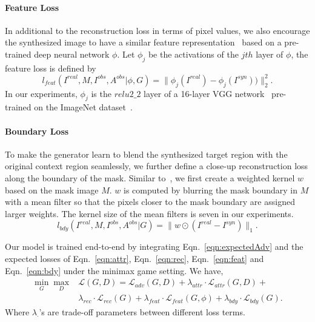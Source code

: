\documentclass[acmtog,timestamp]{acmart}
\begin{document}
\paragraph{Feature Loss}
In additional to the reconstruction loss in terms of pixel values, we also encourage the synthesized image to have a similar feature representation~\cite{johnson2016perceptual} based on a pre-trained deep neural network $\phi$. Let $\phi_{j}$ be the activations of the $jth$ layer of $\phi$, the feature loss is defined by
\begin{equation}
l_{feat}(I^{real}, M, I^{obs}, A^{obs}|\phi, G) = \| \phi_{j}(I^{real}) - \phi_{j}(I^{syn})) \|_{2}^{2}.\label{eqn:feat}
\end{equation}
In our experiments, $\phi_{j}$ is the $relu2\_2$ layer of a 16-layer VGG network~\cite{simonyan2014very} pre-trained on the ImageNet dataset~\cite{russakovsky2015imagenet}.

\paragraph{Boundary Loss}
To make the generator learn to blend the synthesized target region with the original context region seamlessly, we further define a close-up reconstruction loss along the boundary of the mask. Similar to~\cite{yeh2017semantic}, we first create a weighted kernel $w$ based on the mask image $M$. $w$ is computed by blurring the mask boundary in $M$ with a mean filter so that the pixels closer to the mask boundary are assigned larger weights. The kernel size of the mean filters is seven in our experiments.
\begin{equation}
l_{bdy}(I^{real}, M, I^{obs}, A^{obs}|G) = \| w \odot (I^{real} - I^{syn}) \|_{1}. \label{eqn:bdy}
\end{equation}

Our model is trained end-to-end by integrating Eqn.~\ref{eqn:expectedAdv} and the expected losses of Eqn.~\ref{eqn:attr}, Eqn.~\ref{eqn:rec}, Eqn.~\ref{eqn:feat} and Eqn.~\ref{eqn:bdy} under the minimax game setting. We have,
\begin{align}
\nonumber \min_G\max_D &\mathcal{L}(G,D) = \mathcal{L}_{adv}(G,D) + \lambda_{attr}\cdot \mathcal{L}_{attr}(G,D) + \\ &\lambda_{rec}\cdot \mathcal{L}_{rec}(G) + \lambda_{feat}\cdot \mathcal{L}_{feat}(G,\phi) + \lambda_{bdy}\cdot \mathcal{L}_{bdy}(G).
\end{align}
Where $\lambda_{\cdot}$'s are trade-off parameters between different loss terms.
\end{document}
